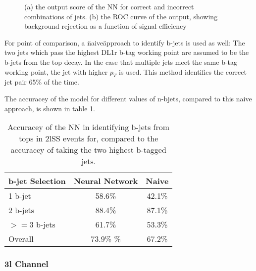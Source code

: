 \begin{figure}[h!]
  \label{fig:top2lSSresults}
  \caption{(a) the output score of the NN for correct and incorrect combinations of jets. (b) the ROC curve of the output, showing background rejection as a function of signal efficiency}
\end{figure}

For point of comparison, a \"naive\" approach to identify b-jets is used as well: The two jets which pass the highest DL1r b-tag working point are assumed to be the b-jets from the top decay. In the case that multiple jets meet the same b-tag working point, the jet with higher $p_T$ is used. This method identifies the correct jet pair 65\% of the time. 

The accuracey of the model for different values of n-bjets, compared to this naive approach, is shown in table \ref{tab:topMatchAcc2lSS}.

\begin{table}[h!]
  \centering
  \caption{Accuracey of the NN in identifying b-jets from tops in 2lSS events for, compared to the accuracey of taking the two highest b-tagged jets.}
  \begin{tabular}{l|c|c}
    \hline\hline
    b-jet Selection & Neural Network & Naive \\
    \hline
    1 b-jet & 58.6\% & 42.1\% \\
    2 b-jets & 88.4\% & 87.1\% \\
    $>=$3 b-jets & 61.7\% & 53.3\% \\
    \hline
    Overall & 73.9\% \% & 67.2\% \\                                                                                  
    \hline                                                                                                 
  \end{tabular}
  \label{tab:topMatchAcc2lSS}                                                                                           
\end{table}

\subsubsection{3l Channel}
\label{subsec:top3l}
 
